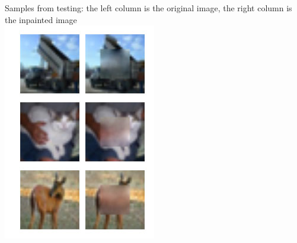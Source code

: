 \documentclass[10pt,twocolumn,letterpaper]{article}
\begin{document}
\newpage
Samples from testing: the left column is the original image, the right column is the inpainted image \\
\includegraphics[width=0.8\linewidth]{baseline_test.jpg} 
\end{document}

